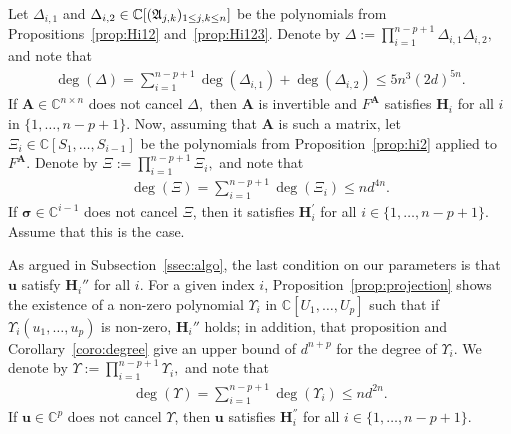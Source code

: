 \documentclass[12pt]{article}
\def\mA{{\bm A}}
\def\ub{{\bm u}}
\def\D{\Delta}
\def\C{\mathbb{C}}
\begin{document}
Let $\Delta_{i,1}$ and $\Delta_{i,2} \in \C[(\frak A_{j,k})_{1\le j,k
    \le n}]$ be the polynomials from Propositions~\ref{prop:Hi12}
and~\ref{prop:Hi123}. Denote by $\Delta := \prod_{i=1}^{n-p+1}
\D_{i,1}\D_{i,2},$ and note that
\begin{align}
    \deg( \Delta) = \sum_{i=1}^{n-p+1} \deg( \D_{i,1})+\deg(\D_{i,2})
    \leq 5n^3(2d)^{5n}.
\end{align}
If $\mA \in \C^{n \times n}$ does not cancel $\Delta,$ then $\mA$ is
invertible and $F^\mA$ satisfies $\bm H_i$ for all $i$ in
$\{1,\hdots,n-p+1\}.$ Now, assuming that $\mA$ is such a matrix, let
$\Xi_i\in \C[S_1,\dots,S_{i-1}]$ be the polynomials from
Proposition~\ref{prop:hi2} applied to $F^{\mA}.$ Denote by $\Xi :=
\prod_{i=1}^{n-p+1} \Xi_i,$ and note that
\begin{align}
    \deg( \Xi)= \sum_{i=1}^{n-p+1} \deg( \Xi_i) \leq nd^{4n}.
\end{align}
If $\bm \sigma \in \C^{i-1}$ does not cancel $\Xi$, then it satisfies
$\bm H_i^{'}$ for all $i \in \{1,\hdots,n-p+1\}.$ Assume that this is
the case.

As argued in Subsection~\ref{ssec:algo}, the last condition on our
parameters is that $\bm u$ satisfy $\bm H_i''$ for all $i$. For a
given index $i$, Proposition~\ref{prop:projection} shows the existence
of a non-zero polynomial $\Upsilon_i$ in $\C[U_1,\dots,U_p]$ such that
if $\Upsilon_i(u_1,\dots,u_p)$ is non-zero, $\bm H_i''$ holds; in
addition, that proposition and Corollary~\ref{coro:degree} give an
upper bound of $d^{n+p}$ for the degree of $\Upsilon_i$. We denote by
$\Upsilon := \prod_{i=1}^{n-p+1} \Upsilon_i,$ and note that
\begin{align}
    \deg( \Upsilon) = \sum_{i=1}^{n-p+1} \deg( \Upsilon_i) \leq nd^{2n}.
\end{align}
If $\ub \in \C^{p}$ does not cancel $\Upsilon$, then $\ub$ satisfies $\bm H_i^{''}$ for all $i \in
\{1,\hdots,n-p+1\}.$
\end{document}
